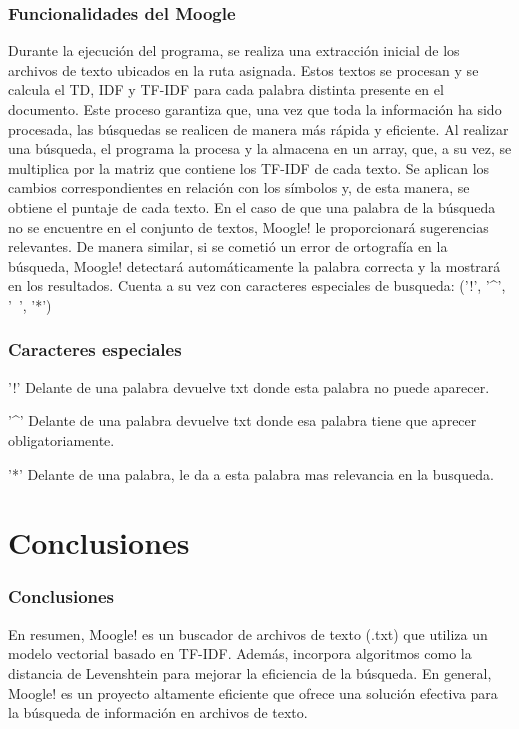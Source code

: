 \documentclass{beamer}
\begin{document}
\begin{frame}
	\frametitle{Funcionalidades del Moogle}
	\begin{minipage}{10 cm}
		Durante la ejecución del programa, se realiza una extracción inicial de los archivos de texto ubicados en la ruta asignada. Estos textos se procesan y se calcula el TD, IDF y TF-IDF para cada palabra distinta presente en el documento. Este proceso garantiza que, una vez que toda la información ha sido procesada, las búsquedas se realicen de manera más rápida y eficiente. Al realizar una búsqueda, el programa la procesa y la almacena en un array, que, a su vez, se multiplica por la matriz que contiene los TF-IDF de cada texto. Se aplican los cambios correspondientes en relación con los símbolos y, de esta manera, se obtiene el puntaje de cada texto. En el caso de que una palabra de la búsqueda no se encuentre en el conjunto de textos, Moogle! le proporcionará sugerencias relevantes. De manera similar, si se cometió un error de ortografía en la búsqueda, Moogle! detectará automáticamente la palabra correcta y la mostrará en los resultados.
Cuenta a su vez con caracteres especiales de busqueda: ('!', '\^{}', '~', '*')
	\end{minipage}
\end{frame}





\begin{frame}
	\frametitle{Caracteres especiales}
	\begin{minipage}{10cm}
	\begin{alertblock}{'!'}
		 Delante de una palabra devuelve txt donde esta palabra no puede aparecer.
	\end{alertblock}
	\begin{alertblock}{'\^{}'}
		Delante de una palabra devuelve txt donde esa palabra tiene que aprecer obligatoriamente.
	\end{alertblock}

      \begin{alertblock}{'*'}
            Delante de una palabra, le da a esta palabra mas relevancia en la busqueda. 
      \end{alertblock} 
	\end{minipage}
\end{frame}




\section{Conclusiones}

\begin{frame}
	\frametitle{Conclusiones}
	\begin{minipage}{10cm}
		En resumen, Moogle! es un buscador de archivos de texto (.txt) que utiliza un modelo vectorial basado en TF-IDF. Además, incorpora algoritmos como la distancia de Levenshtein para mejorar la eficiencia de la búsqueda. En general, Moogle! es un proyecto altamente eficiente que ofrece una solución efectiva para la búsqueda de información en archivos de texto.
	\end{minipage}
\end{frame}
\end{document}
